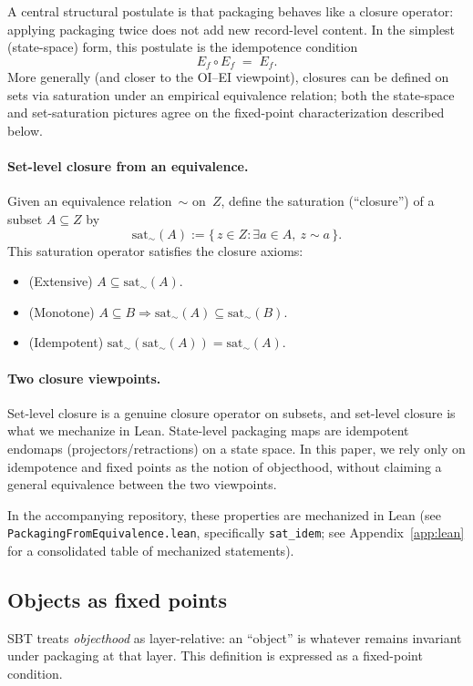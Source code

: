 \documentclass[11pt]{article}
\begin{document}
A central structural postulate is that packaging behaves like a closure operator: applying packaging twice does not add new record-level content.
In the simplest (state-space) form, this postulate is the idempotence condition
\[
E_f \circ E_f \;=\; E_f.
\]
More generally (and closer to the OI--EI viewpoint), closures can be defined on sets via saturation under an empirical equivalence relation; both the state-space and set-saturation pictures agree on the fixed-point characterization described below.

\paragraph{Set-level closure from an equivalence.}
Given an equivalence relation~$\sim$ on~$Z$, define the saturation (``closure'') of a subset $A\subseteq Z$ by
\[
\mathrm{sat}_\sim(A) := \{\, z\in Z : \exists a\in A,\ z\sim a \,\}.
\]
This saturation operator satisfies the closure axioms:
\begin{itemize}
  \item (Extensive) $A \subseteq \mathrm{sat}_\sim(A)$.
  \item (Monotone) $A\subseteq B \Rightarrow \mathrm{sat}_\sim(A)\subseteq \mathrm{sat}_\sim(B)$.
  \item (Idempotent) $\mathrm{sat}_\sim(\mathrm{sat}_\sim(A)) = \mathrm{sat}_\sim(A)$.
\end{itemize}
\paragraph{Two closure viewpoints.}
Set-level closure is a genuine closure operator on subsets, and set-level closure is what we mechanize in Lean. State-level packaging maps are idempotent endomaps (projectors/retractions) on a state space. In this paper, we rely only on idempotence and fixed points as the notion of objecthood, without claiming a general equivalence between the two viewpoints.

In the accompanying repository, these properties are mechanized in Lean (see \texttt{Packaging\-From\-Equivalence.lean}, specifically \texttt{sat\_idem}; see Appendix~\ref{app:lean} for a consolidated table of mechanized statements).

\subsection{Objects as fixed points}

SBT treats \emph{objecthood} as layer-relative: an ``object'' is whatever remains invariant under packaging at that layer.
This definition is expressed as a fixed-point condition.
\end{document}
